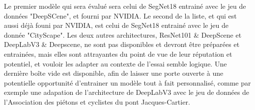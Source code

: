 ﻿\par Le premier modèle qui sera évalué sera celui de SegNet18 entrainé avec le jeu de données "DeepSCene", et fourni par NVIDIA. Le second de la liste, et qui est aussi déjà founi par NVIDIA, est celui de SegNet18 entrainé avec le jeu de donnée "CityScape". Les deux autres architectures, ResNet101 \& DeepScene et DeepLabV3 \& Deepscene, ne sont pas disponibles et devront être préparées et entrainées, mais elles sont attrayantes du point de vue de leur réputation et potentiel, et vouloir les adapter au contexte de l'essai semble logique. Une dernière boîte vide est disponible, afin de laisser une porte ouverte à une potentielle opportunité d'entrainer un modèle tout à fait personnalisé, comme par exemple une adapation de l'architecture de DeepLabV3 avec le jeu de données de l'Association des piétons et cyclistes du pont Jacques-Cartier.
